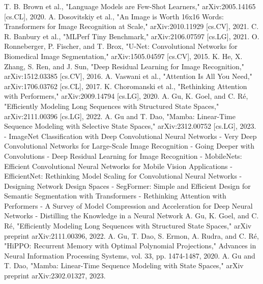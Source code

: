 \documentclass[conference]{IEEEtran}
\begin{document}
\begin{thebibliography}{00}
     T. B. Brown et al., "Language Models are Few-Shot Learners," arXiv:2005.14165 [cs.CL], 2020.
     A. Dosovitskiy et al., "An Image is Worth 16x16 Words: Transformers for Image Recognition at Scale," arXiv:2010.11929 [cs.CV], 2021.
     C. R. Banbury et al., "MLPerf Tiny Benchmark," arXiv:2106.07597 [cs.LG], 2021.
     O. Ronneberger, P. Fischer, and T. Brox, "U-Net: Convolutional Networks for Biomedical Image Segmentation," arXiv:1505.04597 [cs.CV], 2015.
     K. He, X. Zhang, S. Ren, and J. Sun, "Deep Residual Learning for Image Recognition," arXiv:1512.03385 [cs.CV], 2016.
     A. Vaswani et al., "Attention Is All You Need," arXiv:1706.03762 [cs.CL], 2017.
     K. Choromanski et al., "Rethinking Attention with Performers," arXiv:2009.14794 [cs.LG], 2020.
     A. Gu, K. Goel, and C. Ré, "Efficiently Modeling Long Sequences with Structured State Spaces," arXiv:2111.00396 [cs.LG], 2022.
     A. Gu and T. Dao, "Mamba: Linear-Time Sequence Modeling with Selective State Spaces," arXiv:2312.00752 [cs.LG], 2023.
     - ImageNet Classification with Deep Convolutional Neural Networks
     - Very Deep Convolutional Networks for Large-Scale Image Recognition
     - Going Deeper with Convolutions
     - Deep Residual Learning for Image Recognition
     - MobileNets: Efficient Convolutional Neural Networks for Mobile Vision Applications
     - EfficientNet: Rethinking Model Scaling for Convolutional Neural Networks
     - Designing Network Design Spaces
     - SegFormer: Simple and Efficient Design for Semantic Segmentation with Transformers
     - Rethinking Attention with Performers
     - A Survey of Model Compression and Acceleration for Deep Neural Networks
     - Distilling the Knowledge in a Neural Network
     A. Gu, K. Goel, and C. Ré, "Efficiently Modeling Long Sequences with Structured State Spaces," arXiv preprint arXiv:2111.00396, 2022.
     A. Gu, T. Dao, S. Ermon, A. Rudra, and C. Ré, "HiPPO: Recurrent Memory with Optimal Polynomial Projections," Advances in Neural Information Processing Systems, vol. 33, pp. 1474-1487, 2020.
     A. Gu and T. Dao, "Mamba: Linear-Time Sequence Modeling with State Spaces," arXiv preprint arXiv:2302.01327, 2023.


\end{thebibliography}
\end{document}
